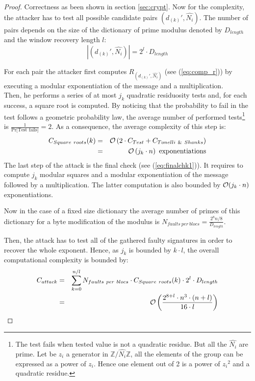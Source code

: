 \documentclass{article}
\begin{document}
\begin{proof}Correctness as been shown in section \ref{sec:crypt}. 
Now for the complexity, the attacker has to test all possible
candidate pairs $(d_{(k)}',\hat{N_i})$.
The number of pairs depends on the size of the dictionary of prime
modulus denoted by $D_{length}$ and the window recovery length $l$:
\begin{equation}
|(d_{(k)}',\hat{N_i})|  = 2^{l} \cdot D_{length}
\end{equation}

For each pair the attacker first computes $R_{(d_{(k)}',\hat{N_i})}$ (see (\ref{eq:comp_r})) by executing a modular exponentiation of the message and a multiplication.\\
Then, he performs a series of at most $j_k$ 
quadratic residuosity tests and, for
each success, a square root is computed. By noticing that the
probability to fail in the test follows a geometric probability law,
the average number of performed tests\footnote[4]{The test fails when tested
  value is not a quadratic residue. But all the $\hat{N_i}$ are prime.
Let be $z_i$ a generator in $\mathbb{Z}/\hat{N_i}\mathbb{Z}$, all the
elements of the group can be expressed as a power of ${z_{i}}$. Hence
one element out of 2 is a power of ${z_{i}}^2$ and a quadratic
residue.} is $\frac{1}{ \mbox{Pr[Test fails]}} = 2$.
 As a consequence, the average complexity of this step
is:
\begin{eqnarray}
 {C}_{Square~roots}(k) & = & {\cal O}\left( 2 \cdot {C}_{Test} + {C}_{Tonelli~\&~Shanks} \right)\\\nonumber
		    & = & {\cal O}\left(j_k \cdot n \right) \mbox{ exponentiations} 
\end{eqnarray}
The last step of the attack is the final check (see
(\ref{eq:finalchk1})). It requires to compute $j_k$ modular squares
and a modular exponentiation of the message followed by a
multiplication. The latter computation is also bounded by 
${\cal O}(j_k \cdot n)$ exponentiations. 

Now in the case of a fixed size dictionary the average number of
primes of this dictionary for a byte modification of the modulus is
${N}_{faults~per~blocs} = \frac{2^8 n/8}{D_{length}}$.

Then, the  attack has to test all of the
gathered faulty signatures in order to recover the whole exponent.
Hence, as $j_k$ is bounded by $k \cdot l$, the overall
computational complexity is bounded by:
\begin{eqnarray}
  {C}_{attack} & = & \sum_{k=0}^{n/l} {N}_{faults~per~blocs} \cdot
  {C}_{Square~roots}(k) \cdot 2^{l} \cdot D_{length}\\\nonumber 
& = & {\cal O}\left(\dfrac{2^{8+l} \cdot n^{3} \cdot (n+l)}{16 \cdot l}\right)
\end{eqnarray}
\end{proof}
\end{document}
